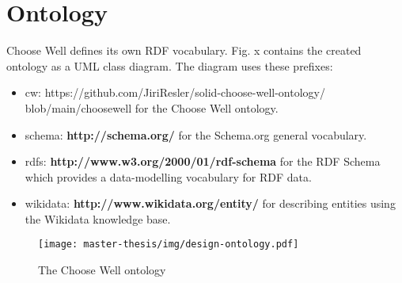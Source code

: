 \section{Ontology}
Choose Well defines its own RDF vocabulary. 
Fig. x contains the created ontology as a UML class diagram. 
The diagram uses these prefixes:
\begin{itemize}[noitemsep,nolistsep]
  \item cw: https://github.com/JiriResler/solid-choose-well-ontology/ \newline blob/main/choosewell for the Choose Well ontology.
  \item schema: \textbf{http://schema.org/} for the Schema.org general vocabulary. 
  \item rdfs: \textbf{http://www.w3.org/2000/01/rdf-schema} for the RDF Schema which provides a data-modelling vocabulary for RDF data.
  \item wikidata: \textbf{http://www.wikidata.org/entity/} for describing entities using the Wikidata knowledge base.
\end{itemize}

\begin{figure}[h]
  \centering
  \texttt{[image: master-thesis/img/design-ontology.pdf]}
  \caption{The Choose Well ontology}
\end{figure}